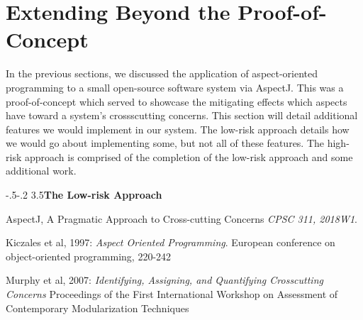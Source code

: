 \documentclass[sigconf]{acmart}
\makeatletter
\def\subsubsection{\@startsection{subsubsection}{3}{10pt}%
                                 {-.5\baselineskip \@plus -2\p@ \@minus -.2\p@}%
                 {3.5\p@}{\subsubsectionfont}}
\makeatother
\begin{document}
\section{Extending Beyond the Proof-of-Concept}
In the previous sections, we discussed the application of aspect-oriented programming to a small open-source software system via AspectJ. This was a proof-of-concept which served to showcase the mitigating effects which aspects have toward a system's crossscutting concerns. This section will detail additional features we would implement in our system. The low-risk approach details how we would go about implementing some, but not all of these features. The high-risk approach is comprised of the completion of the low-risk approach and some additional work.

\subsubsection{\textbf{The Low-risk Approach}}


\begin{thebibliography}{9}
AspectJ, A Pragmatic Approach to Cross-cutting Concerns
\textit{CPSC 311, 2018W1}. 

Kiczales et al, 1997: 
\textit{Aspect Oriented Programming}. 
European conference on object-oriented programming, 220-242

Murphy et al, 2007: 
\textit{Identifying, Assigning, and Quantifying Crosscutting Concerns}
Proceedings of the First International Workshop on Assessment of Contemporary Modularization Techniques

\end{thebibliography}
\end{document}
